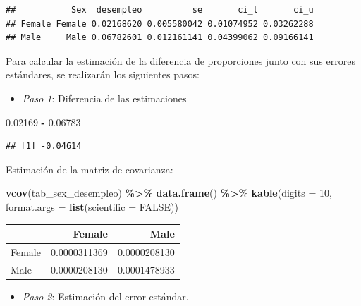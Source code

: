 \documentclass[
  spanish,
  12pt,
]{book}
\newenvironment{Shaded}{\begin{snugshade}}{\end{snugshade}}
\newcommand{\AttributeTok}[1]{\textcolor[rgb]{0.13,0.29,0.53}{#1}}
\newcommand{\ConstantTok}[1]{\textcolor[rgb]{0.56,0.35,0.01}{#1}}
\newcommand{\DecValTok}[1]{\textcolor[rgb]{0.00,0.00,0.81}{#1}}
\newcommand{\FloatTok}[1]{\textcolor[rgb]{0.00,0.00,0.81}{#1}}
\newcommand{\FunctionTok}[1]{\textcolor[rgb]{0.13,0.29,0.53}{\textbf{#1}}}
\newcommand{\NormalTok}[1]{#1}
\newcommand{\SpecialCharTok}[1]{\textcolor[rgb]{0.81,0.36,0.00}{\textbf{#1}}}
\providecommand{\tightlist}{%
  \setlength{\itemsep}{0pt}\setlength{\parskip}{0pt}}
\begin{document}
\begin{verbatim}
##           Sex  desempleo          se       ci_l       ci_u
## Female Female 0.02168620 0.005580042 0.01074952 0.03262288
## Male     Male 0.06782601 0.012161141 0.04399062 0.09166141
\end{verbatim}

Para calcular la estimación de la diferencia de proporciones junto con sus errores estándares, se realizarán los siguientes pasos:

\begin{itemize}
\tightlist
\item
  \emph{Paso 1}: Diferencia de las estimaciones
\end{itemize}

\begin{Shaded}
\begin{Highlighting}[]
\FloatTok{0.02169} \SpecialCharTok{{-}} \FloatTok{0.06783}   
\end{Highlighting}
\end{Shaded}

\begin{verbatim}
## [1] -0.04614
\end{verbatim}

Estimación de la matriz de covarianza:

\begin{Shaded}
\begin{Highlighting}[]
\FunctionTok{vcov}\NormalTok{(tab\_sex\_desempleo) }\SpecialCharTok{\%\textgreater{}\%} \FunctionTok{data.frame}\NormalTok{() }\SpecialCharTok{\%\textgreater{}\%} 
  \FunctionTok{kable}\NormalTok{(}\AttributeTok{digits =} \DecValTok{10}\NormalTok{,}
        \AttributeTok{format.args =} \FunctionTok{list}\NormalTok{(}\AttributeTok{scientific =} \ConstantTok{FALSE}\NormalTok{))}
\end{Highlighting}
\end{Shaded}

\begin{tabular}{l|r|r}
\hline
  & Female & Male\\
\hline
Female & 0.0000311369 & 0.0000208130\\
\hline
Male & 0.0000208130 & 0.0001478933\\
\hline
\end{tabular}

\begin{itemize}
\tightlist
\item
  \emph{Paso 2}: Estimación del error estándar.
\end{itemize}
\end{document}
